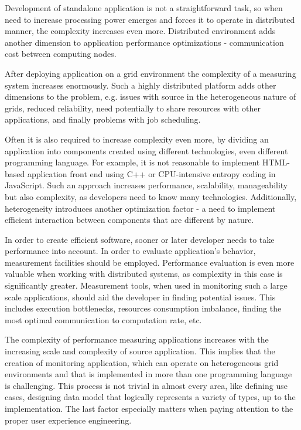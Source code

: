 Development of standalone application is not a straightforward task, so when need to increase processing power emerges and forces it to operate in distributed manner, the complexity increases even more. Distributed environment adds another dimension to application performance optimizations - communication cost between computing nodes.

After deploying application on a grid environment the complexity of a measuring system increases enormously. Such a highly distributed platform adds other dimensions to the problem, e.g. issues with source in the heterogeneous nature of grids, reduced reliability, need potentially to share resources with other applications, and finally problems with job scheduling.

Often it is also required to increase complexity even more, by dividing an application into components created using different technologies, even different programming language. For example, it is not reasonable to implement HTML-based application front end using C++ or CPU-intensive entropy coding in JavaScript. Such an approach increases performance, scalability, manageability but also complexity, as developers need to know many technologies. Additionally, heterogeneity introduces another optimization factor - a need to implement efficient interaction between components that are different by nature.

In order to create efficient software, sooner or later developer needs to take performance into account. In order to evaluate application\rq{}s behavior, measurement facilities should be employed. Performance evaluation is even more valuable when working with distributed systems, as complexity in this case is significantly greater. Measurement tools, when used in monitoring such a large scale applications, should aid the developer in finding potential issues. This includes execution bottlenecks, resources consumption imbalance, finding the most optimal communication to computation rate, etc.

The complexity of performance measuring applications increases with the increasing scale and complexity of source application. This implies that the creation of monitoring application, which can operate on heterogeneous grid environments and that is implemented in more than one programming language is challenging. This process is not trivial in almost every area, like defining use cases, designing data model that logically represents a variety of types, up to the implementation. The last factor especially matters when paying attention to the proper user experience engineering.

